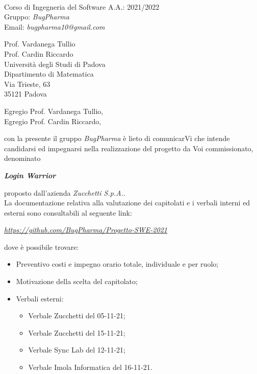 \documentclass[11pt]{letter}
\begin{document}
\begin{letter}{}
\begin{minipage}{0.5\textwidth}
		\end{minipage}
		\vspace{0.5cm}
		\\
		Corso di Ingegneria del Software A.A.: 2021/2022 \\
		Gruppo: \textit{BugPharma} \\
		Email:\textit{ bugpharma10@gmail.com} \\
		\begin{flushright}
			Prof. Vardanega Tullio \\ 
			Prof. Cardin Riccardo \\ 
			Università degli Studi di Padova \\
			Dipartimento di Matematica \\ 
			Via Trieste, 63 \\ 
			35121 Padova
		\end{flushright}
		\opening{Egregio Prof. Vardanega Tullio,\\ Egregio Prof. Cardin Riccardo,}
		con la presente il gruppo \textit{BugPharma} è lieto di comunicarVi che intende candidarsi ed impegnarsi nella realizzazione
		del progetto da Voi commissionato, denominato \\
		\begin{center}
			\textit{\textbf{Login Warrior}}
		\end{center}
		proposto dall'azienda \textit{Zucchetti S.p.A.}. \\
		La documentazione relativa alla valutazione dei capitolati e i verbali interni ed esterni sono consultabili al seguente link: \\
		\begin{center}
			\textit{\href{https://github.com/BugPharma/Progetto-SWE-2021}{{https://github.com/BugPharma/Progetto-SWE-2021}}} \\
		\end{center}
		dove è possibile trovare:
		\begin{itemize}
			\item Preventivo costi e impegno orario totale, individuale e per ruolo;
			\item Motivazione della scelta del capitolato;
			\item Verbali esterni:
			\begin{itemize}
				\item Verbale Zucchetti del 05-11-21;
				\item Verbale Zucchetti del 15-11-21;
				\item Verbale Sync Lab del 12-11-21;
				\item Verbale Imola Informatica del 16-11-21.

\end{itemize}
\end{itemize}
\end{letter}
\end{document}
